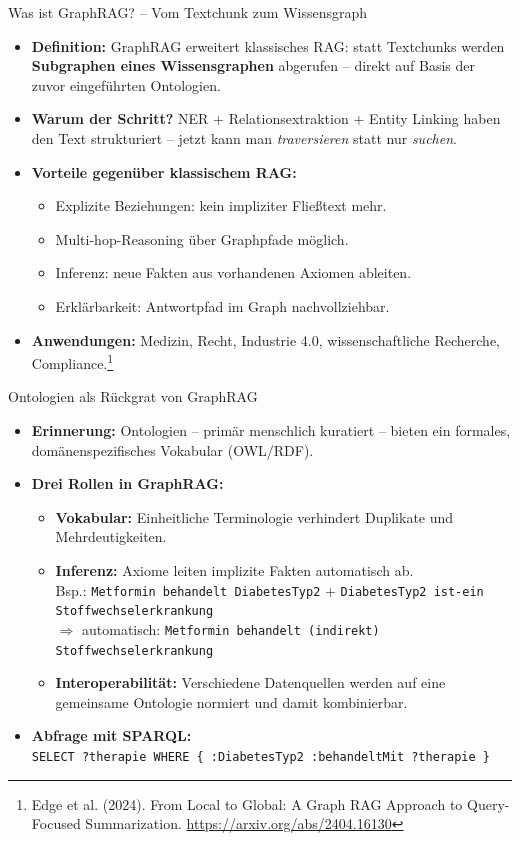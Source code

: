 \documentclass[aspectratio=1610, xcolor=dvipsnames, 9pt]{beamer}
\begin{document}
\begin{frame}{Was ist GraphRAG? -- Vom Textchunk zum Wissensgraph}
  \begin{itemize}
    \item \textbf{Definition:} GraphRAG erweitert klassisches RAG: statt Textchunks werden \textbf{Subgraphen eines Wissensgraphen} abgerufen -- direkt auf Basis der zuvor eingeführten Ontologien.
    \item \textbf{Warum der Schritt?} NER + Relationsextraktion + Entity Linking haben den Text strukturiert -- jetzt kann man \emph{traversieren} statt nur \emph{suchen}.
    \item \textbf{Vorteile gegenüber klassischem RAG:}
      \begin{itemize}
        \item Explizite Beziehungen: kein impliziter Fließtext mehr.
        \item Multi-hop-Reasoning über Graphpfade möglich.
        \item Inferenz: neue Fakten aus vorhandenen Axiomen ableiten.
        \item Erklärbarkeit: Antwortpfad im Graph nachvollziehbar.
      \end{itemize}
    \item \textbf{Anwendungen:} Medizin, Recht, Industrie 4.0, wissenschaftliche Recherche, Compliance.\footnote{Edge et al. (2024). From Local to Global: A Graph RAG Approach to Query-Focused Summarization. \url{https://arxiv.org/abs/2404.16130}}
  \end{itemize}
\end{frame}

\begin{frame}{Ontologien als Rückgrat von GraphRAG}
  \begin{itemize}
    \item \textbf{Erinnerung:} Ontologien -- primär menschlich kuratiert -- bieten ein formales, domänenspezifisches Vokabular (OWL/RDF).
    \item \textbf{Drei Rollen in GraphRAG:}
      \begin{itemize}
        \item \textbf{Vokabular:} Einheitliche Terminologie verhindert Duplikate und Mehrdeutigkeiten.
        \item \textbf{Inferenz:} Axiome leiten implizite Fakten automatisch ab.\\
          Bsp.: \texttt{Metformin behandelt DiabetesTyp2} + \texttt{DiabetesTyp2 ist-ein Stoffwechselerkrankung}\\
          $\Rightarrow$ automatisch: \texttt{Metformin behandelt (indirekt) Stoffwechselerkrankung}
        \item \textbf{Interoperabilität:} Verschiedene Datenquellen werden auf eine gemeinsame Ontologie normiert und damit kombinierbar.
      \end{itemize}
    \item \textbf{Abfrage mit SPARQL:}\\
      \texttt{SELECT ?therapie WHERE \{ :DiabetesTyp2 :behandeltMit ?therapie \}}
  \end{itemize}
\end{frame}
\end{document}
